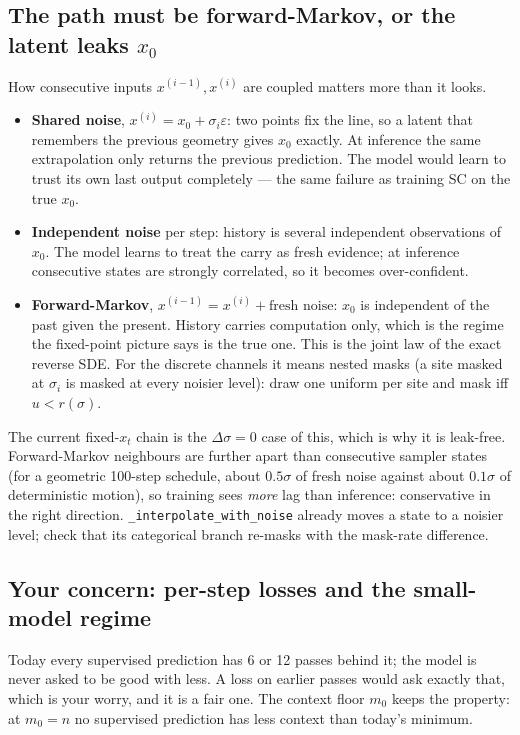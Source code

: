 \documentclass[11pt,a4paper]{article}
\newcommand{\code}[1]{\texttt{#1}}
\begin{document}
\subsection{The path must be forward-Markov, or the latent leaks $x_0$}\label{sec:leak}

How consecutive inputs $x^{(i-1)},x^{(i)}$ are coupled matters more than it looks.
\begin{itemize}
  \item \textbf{Shared noise}, $x^{(i)}=x_0+\sigma_i\varepsilon$: two points fix the
        line, so a latent that remembers the previous geometry gives $x_0$ exactly. At
        inference the same extrapolation only returns the previous prediction. The
        model would learn to trust its own last output completely --- the same failure
        as training SC on the true $x_0$.
  \item \textbf{Independent noise} per step: history is several independent
        observations of $x_0$. The model learns to treat the carry as fresh evidence;
        at inference consecutive states are strongly correlated, so it becomes
        over-confident.
  \item \textbf{Forward-Markov}, $x^{(i-1)}=x^{(i)}+\text{fresh noise}$: $x_0$ is
        independent of the past given the present. History carries computation only,
        which is the regime the fixed-point picture says is the true one. This is the
        joint law of the exact reverse SDE. For the discrete channels it means nested
        masks (a site masked at $\sigma_i$ is masked at every noisier level): draw one
        uniform per site and mask iff $u<r(\sigma)$.
\end{itemize}
The current fixed-$x_t$ chain is the $\Delta\sigma=0$ case of this, which is why it is
leak-free. Forward-Markov neighbours are further apart than consecutive sampler states
(for a geometric 100-step schedule, about $0.5\sigma$ of fresh noise against about
$0.1\sigma$ of deterministic motion), so training sees \emph{more} lag than inference:
conservative in the right direction. \code{\_interpolate\_with\_noise} already moves a
state to a noisier level; check that its categorical branch re-masks with the
mask-rate difference.

\subsection{Your concern: per-step losses and the small-model regime}

Today every supervised prediction has 6 or 12 passes behind it; the model is never
asked to be good with less. A loss on earlier passes would ask exactly that, which is
your worry, and it is a fair one. The context floor $m_0$ keeps the property: at
$m_0=n$ no supervised prediction has less context than today's minimum.
\end{document}
